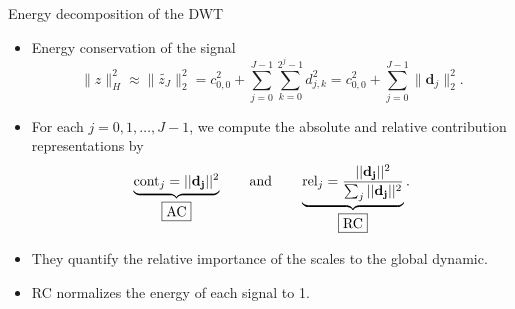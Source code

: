 \documentclass[xcolor=dvipsnames, smaller]{beamer}
\newcommand{\set}[1]{\lbrace#1\rbrace}               %
\begin{document}

\begin{frame}{Energy decomposition of the DWT}

\begin{block}{ }
 \begin{itemize}
  \item Energy conservation of the signal
%
  \begin{equation*}\label{eq:energy}  
     \| z \|_H^2    \approx     \| \widetilde{z_J} \|_2^2 
        = c_{0,0}^2 + \sum_{j=0}^{J-1} \sum_{k=0}^{2^j-1} d_{j,k} ^2  = 
                     c_{0,0}^2 + \sum_{j=0}^{J-1} \| \mathbf{d}_{j} \|_2^2.
  \end{equation*}
 \item For each $j=0,1,\ldots,J-1$, we compute the absolute and 
 relative contribution representations by
%      
   \[ \underbrace{\hbox{cont}_j = ||\mathbf{d_j}||^2}_{\fbox{AC}}  
      \qquad  \text{and}  \qquad
       \underbrace{\hbox{rel}_j  = 
     \frac{||\mathbf{d_j}||^2}
          {\sum_j ||\mathbf{d_j}||^2 }}_{\fbox{RC}} .\]
 \item They quantify the relative importance of the scales to the global dynamic.
 \item RC normalizes the energy of each signal to 1.
\end{itemize}
\end{block}
\end{frame}
\end{document}
